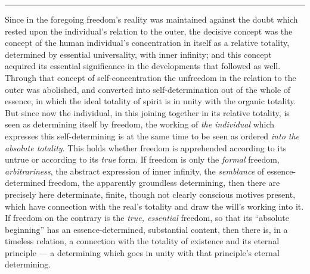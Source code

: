 \documentclass[12pt,a4paper]{book}
\begin{document}
\begin{center}\rule{2cm}{0.4pt}\end{center}

Since in the foregoing freedom's reality was maintained against the doubt which
rested upon the individual's relation to the outer, the decisive concept was
the concept of the human individual's concentration in itself as a relative
totality, determined by essential universality, with inner infinity; and this
concept acquired its essential significance in the developments that followed
as well. Through that concept of self-concentration the unfreedom in the
relation to the outer was abolished, and converted into self-determination out
of the whole of essence, in which the ideal totality of spirit is in unity with
the organic totality. But since now the individual, in this joining together in
its relative totality, is seen as determining itself by freedom, the working of
\emph{the individual} which expresses this self-determining is at the same time
to be seen as ordered \emph{into the absolute totality}. This holds whether
freedom is apprehended according to its untrue or according to its \emph{true}
form. If freedom is only the \emph{formal} freedom, \emph{arbitrariness}, the
abstract expression of inner infinity, the \emph{semblance} of
essence-determined freedom, the apparently groundless determining, then there
are precisely here determinate, finite, though not clearly conscious motives
present, which have connection with the real's totality and draw the will's
working into it. If freedom on the contrary is the \emph{true, essential}
freedom, so that its ``absolute beginning'' has an essence-determined,
substantial content, then there is, in a timeless relation, a connection with
the totality of existence and its eternal principle --- a determining which goes
in unity with that principle's eternal determining.
\end{document}
